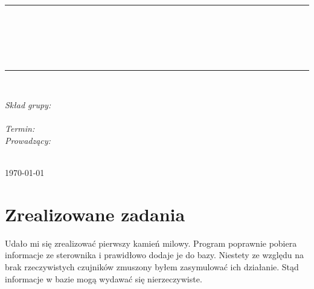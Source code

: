\documentclass[10pt, a4paper]{article}
\begin{document}
\def\tablename{Tabela}	%

\begin{titlepage}
	\begin{center}
		\textsc{\LARGE \formakursu}\\[1cm]		
		\textsc{\Large \kurs}\\[0.5cm]		
		\rule{\textwidth}{0.08cm}\\[0.4cm]
		{\huge \bfseries \doctype}\\[1cm]
		{\huge \bfseries \projectname}\\[0.5cm]
		{\huge \bfseries \acronim}\\[0.4cm]
		\rule{\textwidth}{0.08cm}\\[1cm]
		
		\begin{flushright} \large
		\emph{Skład grupy:}\\
		\osobaA\\[0.4cm]

		
		\emph{Termin: }\termin\\[0.4cm]

		\emph{Prowadzący:} \\
		\prowadzacy \\
		
		\end{flushright}
		
		\vfill
		
		{\large \today}
	\end{center}	
\end{titlepage}

\newpage

\section{Zrealizowane zadania}
\label{sec:OpisProjektu}

Udało mi się zrealizować pierwszy kamień milowy. Program poprawnie pobiera informacje ze sterownika i prawidłowo dodaje je do bazy. Niestety ze względu na brak rzeczywistych czujników zmuszony byłem zasymulować ich działanie. Stąd informacje w bazie mogą wydawać się nierzeczywiste.

\end{document}
